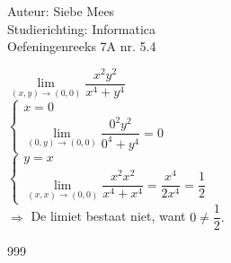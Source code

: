 \documentclass[a4paper]{article}
\begin{document}
  
\noindent \large Auteur: Siebe Mees \\
\noindent \large Studierichting: Informatica\\
\noindent \large Oefeningenreeks 7A nr. 5.4\\

\medskip

\normalsize

$ \lim\limits_{(x,y)\rightarrow(0,0)} \dfrac{x^2y^2}{x^4+y^4} $\\

$ \left \{
\begin{array}{l}
x=0 \\
\lim\limits_{(0,y)\rightarrow(0,0)} \dfrac{0^2y^2}{0^4+y^4}=0
\end{array}
\right .$\\

$ \left \{
\begin{array}{l}
y=x \\
\lim\limits_{(x,x)\rightarrow(0,0)} \dfrac{x^2x^2}{x^4+x^4}=\dfrac{x^4}{2x^4}=\dfrac{1}{2}
\end{array}
\right .$\\

$ \Rightarrow $ De limiet bestaat niet, want $ 0\neq\dfrac{1}{2}. $\\

\begin{thebibliography}{999}
\end{thebibliography}
\end{document}
